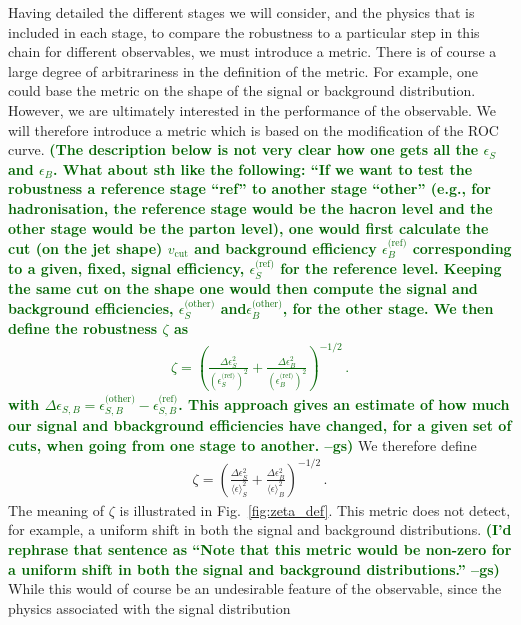 \documentclass[11pt,letterpaper]{article}
\DeclareRobustCommand{\Fig}[1]{Fig.~\ref{#1}}
\newcommand{\gs}[1]{\textbf{\textcolor{darkgreen}{(#1 --gs)}}}
\begin{document}
Having detailed the different stages we will consider, and the physics
that is included in each stage,  to compare the robustness to a
particular step in this chain for different observables, we must
introduce a metric. There is of course a large degree of arbitrariness
in the definition of the metric. For example, one could base the
metric on the shape of the signal or background distribution.
However, we are ultimately interested in the performance of the observable. We will therefore introduce a metric which is based on the modification of the ROC curve. \gs{The description below is not very clear how one gets all the
  $\epsilon_S$ and $\epsilon_B$. What about sth like the
  following: ``If we want to test the robustness a reference stage
  ``ref'' to another stage ``other'' (e.g., for hadronisation, the
  reference stage would be the hacron level and the other stage would
  be the parton level), one would first calculate the cut (on the jet
  shape) $v_{\text{cut}}$ and background efficiency
  $\epsilon_B^{\text{(ref)}}$ corresponding to a given, fixed, signal
  efficiency, $\epsilon_S^{\text{(ref)}}$ for the reference level.
  Keeping the same cut on the shape one would then compute the signal
  and background efficiencies, $\epsilon_S^{\text{(other)}}$
  and$\epsilon_B^{\text{(other)}}$, for the other stage.
  We then define the robustness $\zeta$ as
  \begin{align}
    \zeta=\left(  \frac{\Delta \epsilon_S^2}{ (\epsilon_S^{\text{(ref)}})^2}  +\frac{\Delta \epsilon_B^2}{ (\epsilon_B^{\text{(ref)}})^2}  \right)^{-1/2}\,.
\end{align}
with
$\Delta
\epsilon_{S,B}=\epsilon_{S,B}^{\text{(other)}}-\epsilon_{S,B}^{\text{(ref)}}$.
  This approach gives an estimate of how much our signal and
  bbackground efficiencies have changed, for a given set of cuts, when
  going from one stage to another. }
We therefore define
\begin{align}
\zeta=\left(  \frac{\Delta \epsilon_S^2}{ \langle \epsilon \rangle_S^2}  +\frac{\Delta \epsilon_B^2}{ \langle \epsilon \rangle_B^2}  \right)^{-1/2}\,.
\end{align}
The meaning of $\zeta$ is illustrated in \Fig{fig:zeta_def}.
%
This metric does not detect, for example, a uniform shift in both the
signal and background distributions. \gs{I'd rephrase that sentence as
  ``Note that this metric would be non-zero for a uniform shift in both the
  signal and background distributions.''}
%
While this would of course be an undesirable feature of the
observable, since the physics associated with the signal distribution
\end{document}
